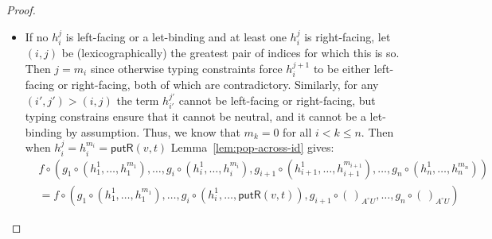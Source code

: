 \documentclass[twoside,11pt,final]{entics}
\newcommand{\getl}{\mathsf{getL}}
\newcommand{\putr}{\mathsf{putR}}
\newcommand{\getr}{\mathsf{getR}}
\newcommand{\putl}{\mathsf{putL}}
\newcommand{\from}{\leftarrow}
\newcommand{\seq}{,\!\ldots\!,}
\begin{document}
\begin{proof}
\begin{itemize}
  Finally, suppose $j > 1$. If $h_i^j = \putl(v,t)$ then typing constraints, together with the assumption that $(i,j)$ is the smallest pair of indices for which $h_i^j$ is left-facing, ensure that $h_i^{j-1} = \getr(x.s)$ and we have:
  \begin{align*}
    & f \circ (g_1 \circ (h_1^1 \seq h_1^{m_1}) \seq g_i \circ (h_i^1 \seq h_i^{j-1},h_i^j \seq h_i^{m_i}) \seq g_n \circ (h_n^1 \seq h_n^{m_n}))
    \\&= f \circ (g_1 \circ (h_1^1 \seq h_1^{m_1}) \seq g_i \circ (h_i^1 \seq \getr(x.s),\putl(v,t) \seq h_i^{m_i}) \seq g_n \circ (h_n^1 \seq h_n^{m_n}))
    \\& \to f \circ (g_1 \circ (h_1^1 \seq h_1^{m_1}) \seq g_i \circ (h_i^1 \seq s[v/x],t \seq h_i^{m_i}) \seq g_n \circ (h_n^1 \seq h_n^{m_n}))
    \\& \stackrel{*}{\leftrightarrow} (f \circ (g_1 \seq g_i \seq g_n)) \circ (h_1^1 \seq h_1^{m_1} \seq h_i^1 \seq s[v/x],t \seq h_i^{m_i} \seq h_n^1 \seq h_n^{m_n})
    \\& \from (f \circ (g_1 \seq g_i \seq g_n)) \circ (h_1^1 \seq h_1^{m_1} \seq h_i^1 \seq \getr(x.s),\putl(v,t) \seq h_i^{m_i} \seq h_n^1 \seq h_n^{m_n})
    \\&= (f \circ (g_1 \seq g_i \seq g_n)) \circ (h_1^1 \seq h_1^{m_1} \seq h_i^1 \seq h_i^{j-1}, h_i^j \seq h_i^{m_i} \seq h_n^1 \seq h_n^{m_n})
  \end{align*}
  as required. The case where $h_i^j = \getl(x.t)$ is similar.
\item If no $h_i^j$ is left-facing or a let-binding and at least one $h_i^j$ is right-facing, let $(i,j)$ be (lexicographically) the greatest pair of indices for which this is so. Then $j = m_i$ since otherwise typing constraints force $h_i^{j+1}$ to be either left-facing or right-facing, both of which are contradictory. Similarly, for any $(i',j') > (i,j)$ the term $h_{i'}^{j'}$ cannot be left-facing or right-facing, but typing constrains ensure that it cannot be neutral, and it cannot be a let-binding by assumption. Thus, we know that $m_k = 0$ for all $i < k \leq n$. Then when $h_i^j = h_i^{m_i} = \putr(v,t)$ Lemma~\ref{lem:pop-across-id} gives:
  \begin{align*}
    & f \circ (g_1 \circ (h_1^1 \seq h_1^{m_1}) \seq g_i \circ (h_i^1 \seq h_i^{m_i}),g_{i+1} \circ (h_{i+1}^1 \seq h_{i+1}^{m_{i+1}}) \seq g_n \circ (h_n^1 \seq h_n^{m_n}))
    \\&= f \circ (g_1 \circ (h_1^1 \seq h_1^{m_1}) \seq g_i \circ (h_i^1 \seq \putr(v,t)),g_{i+1} \circ (\,)_{A^\circ U} \seq g_n \circ (\,)_{A^\circ U})

\end{align*}
\end{itemize}
\end{proof}
\end{document}
